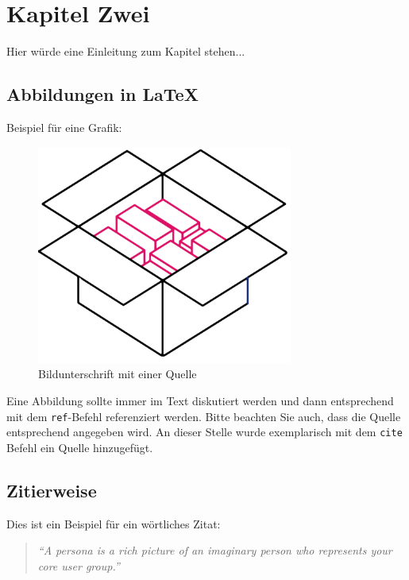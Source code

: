 \chapter{Kapitel Zwei}
Hier würde eine Einleitung zum Kapitel stehen... 

\section{Abbildungen in LaTeX}
\label{sec:abbildungen_in_latex}

Beispiel für eine Grafik:
\begin{figure}[!ht]
	\centering
		\includegraphics[width=0.75\textwidth]{images/MIBox.png}
	\caption{Bildunterschrift mit einer Quelle \citep{Autor2013}}
	\label{fig:box}
\end{figure}

Eine Abbildung sollte immer im Text diskutiert werden und dann entsprechend mit dem \texttt{ref{}}-Befehl referenziert werden. Bitte beachten Sie auch, dass die Quelle entsprechend angegeben wird. An dieser Stelle wurde exemplarisch mit dem \texttt{cite{}} Befehl ein Quelle hinzugefügt.

\section{Zitierweise}
Dies ist ein Beispiel für ein wörtliches Zitat:
\begin{quotation}
	\emph{``A persona is a rich picture of an imaginary person who represents your core user group.''} \citep{Dix04}
\end{quotation}

